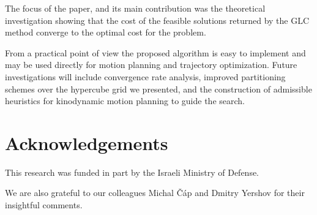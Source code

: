 \documentclass{llncs}
\newcommand{\GLC}{\ensuremath{\mathrm{GLC}}\xspace}
\begin{document}
%

The focus of the paper, and its main contribution was the theoretical investigation showing that the cost of the feasible solutions returned by the \GLC method converge to the optimal cost for the problem.
%

%
From a practical point of view the proposed algorithm is easy to implement and may be used directly for motion planning and trajectory optimization.
%
Future investigations will include convergence rate analysis, improved partitioning schemes over the hypercube grid we presented, and the construction of admissible heuristics for kinodynamic motion planning to guide the search.
\pagebreak
\section*{Acknowledgements}
This research was funded in part by the Israeli Ministry of Defense. 
%

%
We are also grateful to our colleagues Michal \v C\'ap and Dmitry Yershov for their insightful comments. 


\end{document}
